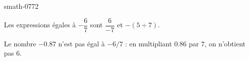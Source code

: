
\begin{corrige}{smath-0772}

    Les expressions égales à \( -\dfrac{ 6 }{ 7 }\) sont \( \dfrac{ 6 }{ -7 }\) et \( -(5\div 7)\).

    Le nombre \( -0.87\) n'est pas égal à \( -6/7\) : en multipliant \( 0.86\) par \( 7\), on n'obtient pas \( 6\).

\end{corrige}
